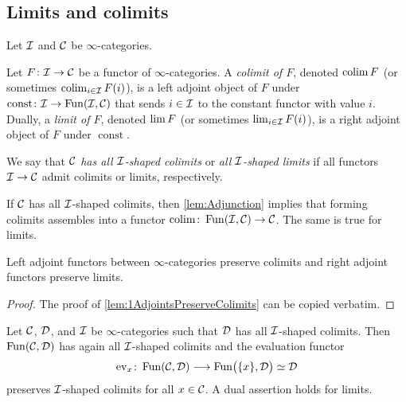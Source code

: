 \subsection{Limits and colimits}
\begin{defi}\label{def:Colimits}
	Let $\mathcal{I}$ and $\mathcal{C}$ be $\infty$-categories.
	\begin{alphanumerate}
		\item Let $F\colon \mathcal{I}\rightarrow \mathcal{C}$ be a functor of $\infty$-categories. A \emph{colimit of $F$}, denoted $\operatorname*{colim} F$ (or sometimes $\operatorname*{colim}_{i\in\mathcal{I}}F(i)$), is a left adjoint object of $F$ under  $\operatorname{const}\colon\mathcal{I}\rightarrow \operatorname{Fun}(\mathcal{I},\mathcal{C})$ that sends $i\in\mathcal{I}$ to the constant functor with value $i$. Dually, a \emph{limit of $F$}, denoted $\operatorname*{lim} F$ (or sometimes $\operatorname*{lim}_{i\in\mathcal{I}}F(i)$), is a right adjoint object of $F$ under $\operatorname{const}$.\label{enum:Colimit}
		\item We say that \emph{$\mathcal{C}$ has all $\mathcal{I}$-shaped colimits} or \emph{all $\mathcal{I}$-shaped limits} if all functors $\mathcal{I}\rightarrow \mathcal{C}$ admit colimits or limits, respectively.\label{enum:ColimitFunctor}
	\end{alphanumerate}
\end{defi}
\begin{rem}\label{rem:ColimitFunctor}
	 If $\mathcal{C}$ has all $\mathcal{I}$-shaped colimits, then \cref{lem:Adjunction} implies that forming colimits assembles into a functor $\operatorname*{colim}\colon \operatorname{Fun}(\mathcal{I},\mathcal{C})\rightarrow \mathcal{C}$. The same is true for limits.
\end{rem}
\begin{lem}\label{lem:AdjointsPreserveColimits}
	Left adjoint functors between $\infty$-categories preserve colimits and right adjoint functors preserve limits.
\end{lem}
\begin{proof}
	The proof of \cref{lem:1AdjointsPreserveColimits} can be copied verbatim.
\end{proof}
\begin{lem}\label{lem:ColimitsInFunctorCategories}
	Let $\mathcal{C}$, $\mathcal{D}$, and $\mathcal{I}$ be $\infty$-categories such that $\mathcal{D}$ has all $\mathcal{I}$-shaped colimits. Then $\operatorname{Fun}(\mathcal{C},\mathcal{D})$ has again all $\mathcal{I}$-shaped colimits and the evaluation functor 
	\begin{equation*}
		\ev_x\colon \Fun(\Cc,\Dd)\longrightarrow \Fun\lef(\{x\},\Dd\righ)\simeq \Dd
	\end{equation*}
	preserves $\mathcal{I}$-shaped colimits for all $x\in \mathcal{C}$. A dual assertion holds for limits.
\end{lem}
